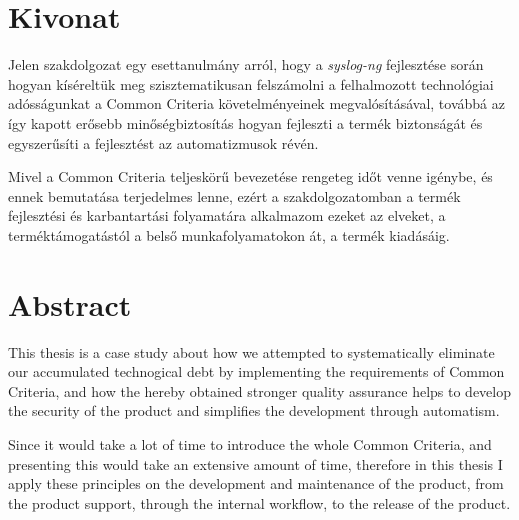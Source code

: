 \chapter*{Kivonat}

Jelen szakdolgozat egy esettanulmány arról, hogy a \emph{syslog-ng} fejlesztése során hogyan
kíséreltük meg szisztematikusan felszámolni a felhalmozott technológiai adósságunkat a Common
Criteria követelményeinek megvalósításával, továbbá az így kapott erősebb minőségbiztosítás hogyan
fejleszti a termék biztonságát és egyszerűsíti a fejlesztést az automatizmusok révén.

Mivel a Common Criteria teljeskörű bevezetése rengeteg időt venne igénybe, és ennek bemutatása
terjedelmes lenne, ezért a szakdolgozatomban a termék fejlesztési és karbantartási folyamatára
alkalmazom ezeket az elveket, a terméktámogatástól a belső munkafolyamatokon át, a termék
kiadásáig.

\vfill

\chapter*{Abstract}

This thesis is a case study about how we attempted to systematically eliminate our accumulated
technogical debt by implementing the requirements of Common Criteria, and how the hereby obtained
stronger quality assurance helps to develop the security of the product and simplifies the
development through automatism.

Since it would take a lot of time to introduce the whole Common Criteria, and presenting this would
take an extensive amount of time, therefore in this thesis I apply these principles on the
development and maintenance of the product, from the product support, through the internal workflow,
to the release of the product.

\vfill

